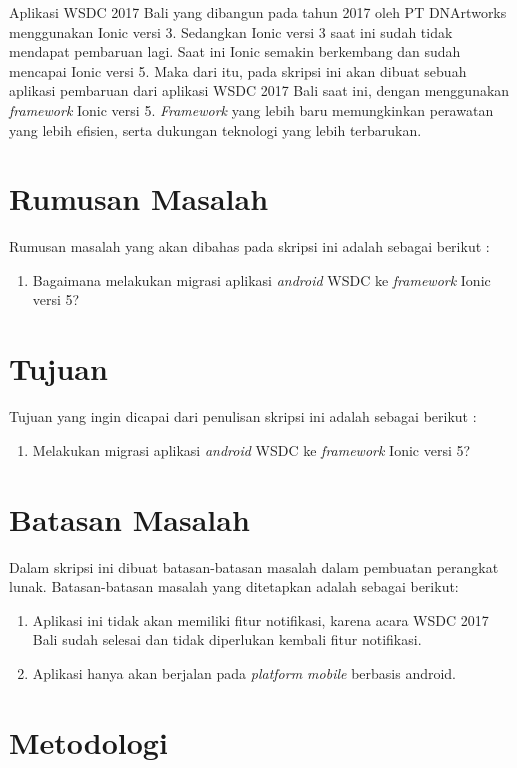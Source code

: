 Aplikasi WSDC 2017 Bali yang dibangun pada tahun 2017 oleh PT DNArtworks menggunakan Ionic versi 3. Sedangkan Ionic versi 3 saat ini sudah tidak mendapat pembaruan lagi. Saat ini Ionic semakin berkembang dan sudah mencapai Ionic versi 5. Maka dari itu, pada skripsi ini akan dibuat sebuah aplikasi pembaruan dari aplikasi WSDC 2017 Bali saat ini, dengan menggunakan \textit{framework} Ionic versi 5. \textit{Framework} yang lebih baru memungkinkan perawatan yang lebih efisien, serta dukungan teknologi yang lebih terbarukan.

\section{Rumusan Masalah}
\label{sec:rumusan}
Rumusan masalah yang akan dibahas pada skripsi ini adalah sebagai berikut :
\begin{enumerate}
	\item Bagaimana melakukan migrasi aplikasi {\it android} WSDC ke {\it framework} Ionic versi 5?
\end{enumerate}


\section{Tujuan}
\label{sec:tujuan}
Tujuan yang ingin dicapai dari penulisan skripsi ini adalah sebagai berikut :
\begin{enumerate}
	\item Melakukan migrasi aplikasi {\it android} WSDC ke {\it framework} Ionic versi 5?
\end{enumerate}

\section{Batasan Masalah}
\label{sec:batasan}
Dalam skripsi ini dibuat batasan-batasan masalah dalam pembuatan perangkat lunak.  Batasan-batasan masalah yang ditetapkan adalah sebagai berikut:

\begin{enumerate}
    \item Aplikasi ini tidak akan memiliki fitur notifikasi, karena acara WSDC 2017 Bali sudah selesai dan tidak diperlukan kembali fitur notifikasi.
    \item Aplikasi hanya akan berjalan pada \textit{platform mobile} berbasis android. 
\end{enumerate}


\section{Metodologi}
\label{sec:metlit}

